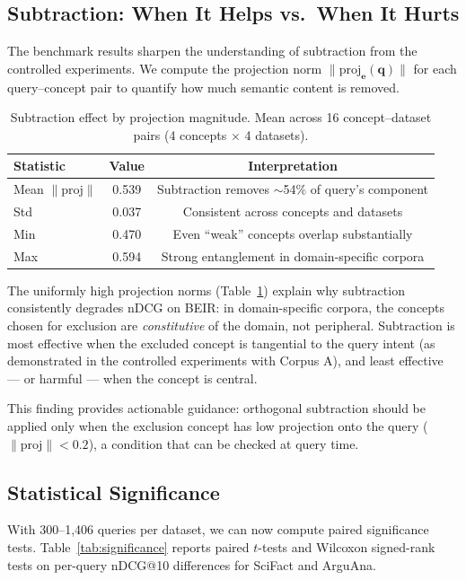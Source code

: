 \documentclass{article}
\begin{document}
\subsection{Subtraction: When It Helps vs.\ When It Hurts}

The benchmark results sharpen the understanding of subtraction from the controlled experiments. We compute the projection norm $\|\text{proj}_\mathbf{e}(\mathbf{q})\|$ for each query--concept pair to quantify how much semantic content is removed.

\begin{table}[ht]
\centering
\caption{Subtraction effect by projection magnitude. Mean across 16 concept--dataset pairs (4 concepts $\times$ 4 datasets).}
\label{tab:beir_proj}
\begin{tabular}{lcc}
\toprule
Statistic & Value & Interpretation \\
\midrule
Mean $\|\text{proj}\|$ & 0.539 & Subtraction removes $\sim$54\% of query's component \\
Std & 0.037 & Consistent across concepts and datasets \\
Min & 0.470 & Even ``weak'' concepts overlap substantially \\
Max & 0.594 & Strong entanglement in domain-specific corpora \\
\bottomrule
\end{tabular}
\end{table}

The uniformly high projection norms (Table~\ref{tab:beir_proj}) explain why subtraction consistently degrades nDCG on BEIR: in domain-specific corpora, the concepts chosen for exclusion are \emph{constitutive} of the domain, not peripheral. Subtraction is most effective when the excluded concept is tangential to the query intent (as demonstrated in the controlled experiments with Corpus A), and least effective --- or harmful --- when the concept is central.

This finding provides actionable guidance: orthogonal subtraction should be applied only when the exclusion concept has low projection onto the query ($\|\text{proj}\| < 0.2$), a condition that can be checked at query time.

\subsection{Statistical Significance}

With 300--1,406 queries per dataset, we can now compute paired significance tests. Table~\ref{tab:significance} reports paired $t$-tests and Wilcoxon signed-rank tests on per-query nDCG@10 differences for SciFact and ArguAna.
\end{document}
